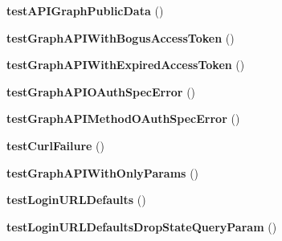 \begin{DoxyCompactItemize}
\item 
\hypertarget{class_p_h_p_s_d_k_test_case_a33328a6a80c0584ea09f5f6bc300df59}{{\bfseries test\-A\-P\-I\-Graph\-Public\-Data} ()}\label{class_p_h_p_s_d_k_test_case_a33328a6a80c0584ea09f5f6bc300df59}

\item 
\hypertarget{class_p_h_p_s_d_k_test_case_a83d6940787341b3a2ea362088fa9f617}{{\bfseries test\-Graph\-A\-P\-I\-With\-Bogus\-Access\-Token} ()}\label{class_p_h_p_s_d_k_test_case_a83d6940787341b3a2ea362088fa9f617}

\item 
\hypertarget{class_p_h_p_s_d_k_test_case_a94b55b9122d9831359bb8f332db4de3d}{{\bfseries test\-Graph\-A\-P\-I\-With\-Expired\-Access\-Token} ()}\label{class_p_h_p_s_d_k_test_case_a94b55b9122d9831359bb8f332db4de3d}

\item 
\hypertarget{class_p_h_p_s_d_k_test_case_a772c46b963660451d95a154f6477072f}{{\bfseries test\-Graph\-A\-P\-I\-O\-Auth\-Spec\-Error} ()}\label{class_p_h_p_s_d_k_test_case_a772c46b963660451d95a154f6477072f}

\item 
\hypertarget{class_p_h_p_s_d_k_test_case_aca2fae0d8b8e54e70336bc300a6f5972}{{\bfseries test\-Graph\-A\-P\-I\-Method\-O\-Auth\-Spec\-Error} ()}\label{class_p_h_p_s_d_k_test_case_aca2fae0d8b8e54e70336bc300a6f5972}

\item 
\hypertarget{class_p_h_p_s_d_k_test_case_ab24f157e77b1609d81ba70116e582268}{{\bfseries test\-Curl\-Failure} ()}\label{class_p_h_p_s_d_k_test_case_ab24f157e77b1609d81ba70116e582268}

\item 
\hypertarget{class_p_h_p_s_d_k_test_case_a9281cd4e8237b082c861580f7ef39eb2}{{\bfseries test\-Graph\-A\-P\-I\-With\-Only\-Params} ()}\label{class_p_h_p_s_d_k_test_case_a9281cd4e8237b082c861580f7ef39eb2}

\item 
\hypertarget{class_p_h_p_s_d_k_test_case_a6f6ed8c1f4eed8f5a8d17ac14a20769e}{{\bfseries test\-Login\-U\-R\-L\-Defaults} ()}\label{class_p_h_p_s_d_k_test_case_a6f6ed8c1f4eed8f5a8d17ac14a20769e}

\item 
\hypertarget{class_p_h_p_s_d_k_test_case_a9090b9531fc1930e4e85b1e25b379949}{{\bfseries test\-Login\-U\-R\-L\-Defaults\-Drop\-State\-Query\-Param} ()}\label{class_p_h_p_s_d_k_test_case_a9090b9531fc1930e4e85b1e25b379949}


\end{DoxyCompactItemize}
